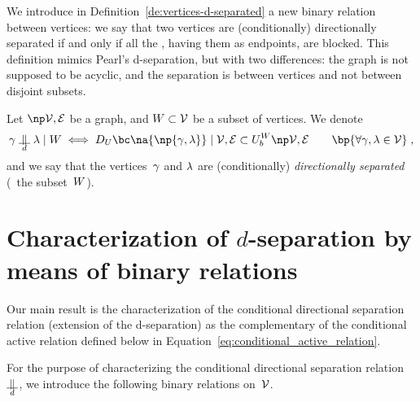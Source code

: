 \documentclass[12pt]{article}
\begin{document}
{{{{{We introduce in Definition~\ref{de:vertices-d-separated} a new binary relation
between vertices: we say that 
two vertices are (conditionally) directionally separated if and only if
all the \undirectedEdgePaths, having them as endpoints, are blocked.
This definition mimics Pearl's d-separation, but with two differences:
the graph is not supposed to be acyclic, and the separation is between vertices
and not between disjoint subsets. 

  \begin{definition}
    \label{de:vertices-d-separated}
    Let \( \npOrientedGraph \) be a graph, 
    and $W\subset{\cal V}$ be a subset of vertices.
    We denote
    \begin{equation}
      \bgent \ConditionalDirectionalSeparation \cgent \mid \AgentSubsetW
      \iff 
      \bcDeploymentInUPaths{\na{\np{\bgent,\cgent}}}{\graph} \subset
      \BlockedUndirectedPaths{\graph}
      \qquad \bp{ \forall \bgent,\cgent \in \AGENT }
      \eqfinv
      \label{eq:vertices-d-separated}
    \end{equation}
    and we say that the vertices~$\gamma$ and $\lambda$ are 
    (conditionally) \emph{directionally separated}  (\wrt\ the subset~$W$).
  \end{definition}




\section{Characterization  of $d$-separation by means of binary relations}
\label{Characterization__of_the_conditional_directional_separation_binary_relation}

Our main result is the characterization of the conditional directional
separation relation (extension of the d-separation)
as the complementary of the conditional active relation defined below in
Equation~\eqref{eq:conditional_active_relation}.

For the purpose of characterizing the conditional directional separation relation~\(
\ConditionalDirectionalSeparation \), we introduce the following binary relations on~${\cal V}$.

}}}}}
\end{document}
